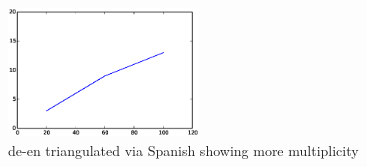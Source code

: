 	\begin{figure}
		\small
		\centering
		\includegraphics[width=0.45\textwidth]{files/Tables/de_es_en.eps}
		\caption{de-en triangulated via Spanish showing more multiplicity}
		\label{figure:de_es-en}
	\end{figure}




